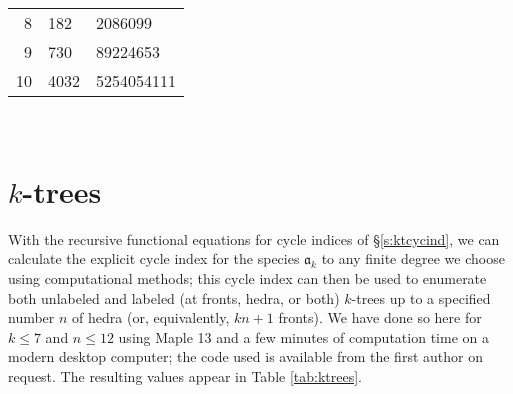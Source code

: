 \documentclass[sectionflow,singlespace,twoside]{brandiss} %
\numberwithin{section}{chapter}
\numberwithin{figure}{chapter}
\begin{document}
\begin{table}[htb]
{\begin{tabular}{r | l l}
      8 & 182 & 2086099 \\
      9 & 730 & 89224653 \\
      10 & 4032 & 5254054111
    \end{tabular}
  }
  \qquad
  \\
\end{table}

\section{$k$-trees}\label{s:ktenum}
With the recursive functional equations for cycle indices of \S \ref{s:ktcycind}, we can calculate the explicit cycle index for the species $\mathfrak{a}_{k}$ to any finite degree we choose using computational methods; this cycle index can then be used to enumerate both unlabeled and labeled (at fronts, hedra, or both) $k$-trees up to a specified number $n$ of hedra (or, equivalently, $kn + 1$ fronts).
We have done so here for $k \leq 7$ and $n \leq 12$ using Maple 13 and a few minutes of computation time on a modern desktop computer; the code used is available from the first author on request.
The resulting values appear in Table \ref{tab:ktrees}.
\end{document}
